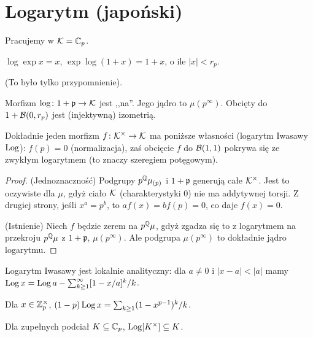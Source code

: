 \section{Logarytm (japoński)}
Pracujemy w $\mathcal K = \mathbb C_p$.

\begin{fakt}
	$\log \exp x = x$, $\exp \log (1+x) = 1 +x$, o ile $|x| < r_p$.
\end{fakt}

(To było tylko przypomnienie).

\begin{wniosek}
	Morfizm $\log \colon 1 + \mathfrak p \to \mathcal K$ jest ,,na''.
	Jego jądro to $\mu(p^\infty)$.
	Obcięty do $1 + \mathcal B(0, r_p)$ jest (injektywną) izometrią.
\end{wniosek}

\begin{fakt}
	Dokładnie jeden morfizm $f \colon \mathcal K^\times \to \mathcal K$ ma poniższe własności (logarytm Iwasawy $\operatorname{Log}$): $f(p) = 0$ (normalizacja), zaś obcięcie $f$ do $\mathcal B(1,1)$ pokrywa się ze zwykłym logarytmem (to znaczy szeregiem potęgowym).
\end{fakt}

\begin{proof}
	(Jednoznaczność) Podgrupy $p^\mathbb Q\mu_{(p)}$ i $1 + \mathfrak p$ generują całe $\mathcal K^\times$.
	Jest to oczywiste dla $\mu$, gdyż ciało $\mathcal K$ (charakterystyki 0) nie ma addytywnej torsji.
	Z drugiej strony, jeśli $x^a = p^b$, to $af(x) = bf(p) = 0$, co daje $f(x) = 0$.

	(Istnienie) Niech $f$ będzie zerem na $p^\mathbb Q\mu$, gdyż zgadza się to z logarytmem na przekroju $p^\mathbb Q\mu$ z $1 + \mathfrak p$, $\mu(p^\infty)$.
	Ale podgrupa $\mu(p^\infty)$ to dokładnie jądro logarytmu.
\end{proof}

\begin{fakt}
	Logarytm Iwasawy jest lokalnie analityczny: dla $a \neq 0$ i $|x - a| < |a|$ mamy
	$\operatorname{Log} x = \operatorname{Log} a - \sum_{k \ge 1}^\infty [1 - x/a]^k / k$.
\end{fakt}

\begin{fakt}
	Dla $x \in \mathbb Z_p^\times$, $(1-p)\operatorname{Log} x = \sum_{k \ge 1} (1-x^{p-1})^k / k$.
\end{fakt}

\begin{fakt}
	Dla zupełnych podciał $K \subseteq \mathbb C_p$, $\operatorname{Log}[K^\times] \subseteq K$.
\end{fakt}

